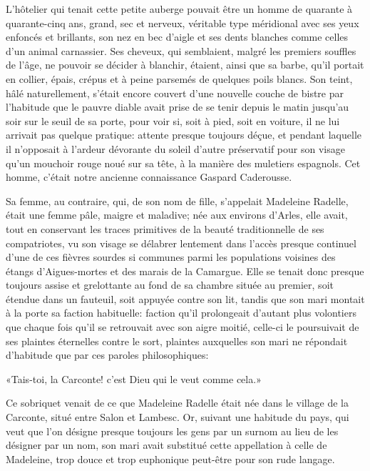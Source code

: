 L'hôtelier qui tenait cette petite auberge pouvait être un homme de quarante à quarante-cinq ans, grand, sec et nerveux, véritable type méridional avec ses yeux enfoncés et brillants, son nez en bec d'aigle et ses dents blanches comme celles d'un animal carnassier. Ses cheveux, qui semblaient, malgré les premiers souffles de l'âge, ne pouvoir se décider à blanchir, étaient, ainsi que sa barbe, qu'il portait en collier, épais, crépus et à peine parsemés de quelques poils blancs. Son teint, hâlé naturellement, s'était encore couvert d'une nouvelle couche de bistre par l'habitude que le pauvre diable avait prise de se tenir depuis le matin jusqu'au soir sur le seuil de sa porte, pour voir si, soit à pied, soit en voiture, il ne lui arrivait pas quelque pratique: attente presque toujours déçue, et pendant laquelle il n'opposait à l'ardeur dévorante du soleil d'autre préservatif pour son visage qu'un mouchoir rouge noué sur sa tête, à la manière des muletiers espagnols. Cet homme, c'était notre ancienne connaissance Gaspard Caderousse.

Sa femme, au contraire, qui, de son nom de fille, s'appelait Madeleine Radelle, était une femme pâle, maigre et maladive; née aux environs d'Arles, elle avait, tout en conservant les traces primitives de la beauté traditionnelle de ses compatriotes, vu son visage se délabrer lentement dans l'accès presque continuel d'une de ces fièvres sourdes si communes parmi les populations voisines des étangs d'Aigues-mortes et des marais de la Camargue. Elle se tenait donc presque toujours assise et grelottante au fond de sa chambre située au premier, soit étendue dans un fauteuil, soit appuyée contre son lit, tandis que son mari montait à la porte sa faction habituelle: faction qu'il prolongeait d'autant plus volontiers que chaque fois qu'il se retrouvait avec son aigre moitié, celle-ci le poursuivait de ses plaintes éternelles contre le sort, plaintes auxquelles son mari ne répondait d'habitude que par ces paroles philosophiques:

«Tais-toi, la Carconte! c'est Dieu qui le veut comme cela.»

Ce sobriquet venait de ce que Madeleine Radelle était née dans le village de la Carconte, situé entre Salon et Lambesc. Or, suivant une habitude du pays, qui veut que l'on désigne presque toujours les gens par un surnom au lieu de les désigner par un nom, son mari avait substitué cette appellation à celle de Madeleine, trop douce et trop euphonique peut-être pour son rude langage.

